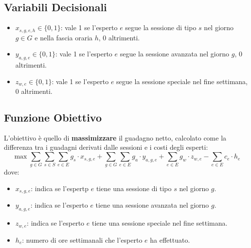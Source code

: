 \documentclass[12pt]{article}
\begin{document}
    \subsection{Variabili Decisionali}
    \begin{itemize}
        \item $x_{s,g,e,h} \in \{0,1\}$: vale 1 se l'esperto $e$ segue la sessione di tipo $s$ nel giorno $g \in G$ e nella fascia oraria $h$, 0 altrimenti.
        \item $y_{a,g,e} \in \{0,1\}$: vale 1 se l'esperto $e$ segue la sessione avanzata nel giorno $g$, 0 altrimenti.
        \item $z_{w,e} \in \{0,1\}$: vale 1 se l'esperto $e$ segue la sessione speciale nel fine settimana, 0 altrimenti.
    \end{itemize}
    \subsection{Funzione Obiettivo}
    L'obiettivo è quello di \textbf{massimizzare} il guadagno netto, calcolato come la differenza tra i guadagni derivati dalle sessioni e i costi degli esperti:
    \begin{equation}
        \max \sum_{g \in G}\sum_{s \in S}\sum_{e \in E} g_s \cdot x_{s,g,e} + \sum_{g \in G}\sum_{e \in E} g_a \cdot y_{a,g,e} + \sum_{e \in E} g_w \cdot z_{w,e} - \sum_{e \in E} c_e \cdot h_e
    \end{equation}
    dove:
    \begin{itemize}
        \item $x_{s,g,e}$: indica se l'espertp $e$ tiene una sessione di tipo $s$ nel giorno $g$.
        \item $y_{a,g,e}$: indica se l'esperto $e$ tiene una sessione avanzata nel giorno $g$.
        \item $z_{w,e}$: indica se l'esperto $e$ tiene una sessione speciale nel fine settimana.
        \item $h_e$: numero di ore settimanali che l'esperto $e$ ha effettuato.
    \end{itemize}
\end{document}

